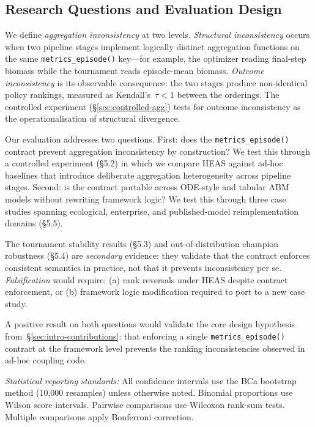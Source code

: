 \documentclass{wscpaperproc}
\begin{document}
\subsection{Research Questions and Evaluation Design}

We define \emph{aggregation inconsistency} at two levels. \emph{Structural inconsistency} occurs when two pipeline stages implement logically distinct aggregation functions on the same \texttt{metrics\_episode()} key---for example, the optimizer reading final-step biomass while the tournament reads episode-mean biomass. \emph{Outcome inconsistency} is its observable consequence: the two stages produce non-identical policy rankings, measured as Kendall's~$\tau < 1$ between the orderings. The controlled experiment (\S\ref{sec:controlled-agg}) tests for outcome inconsistency as the operationalisation of structural divergence.

Our evaluation addresses two questions. First: does the \texttt{metrics\_episode()}
contract prevent aggregation inconsistency by construction? We test this through
a controlled experiment (\S5.2) in which we compare HEAS
against ad-hoc baselines that introduce deliberate aggregation heterogeneity across
pipeline stages. Second: is the contract portable across ODE-style and tabular
ABM models without rewriting framework logic? We test this through three case
studies spanning ecological, enterprise, and published-model reimplementation
domains (\S5.5).

The tournament stability results (\S5.3) and out-of-distribution
champion robustness (\S5.4) are \emph{secondary} evidence: they
validate that the contract enforces consistent semantics in practice, not that
it prevents inconsistency per se. \emph{Falsification} would require: (a) rank
reversals under HEAS despite contract enforcement, or (b) framework logic
modification required to port to a new case study.

A positive result on both questions would validate the core design hypothesis from~\S\ref{sec:intro-contributions}: that enforcing a single \texttt{metrics\_episode()} contract at the framework level prevents the ranking inconsistencies observed in ad-hoc coupling code.

\emph{Statistical reporting standards:} All confidence intervals use the BCa
bootstrap method (10,000 resamples) unless otherwise noted. Binomial proportions
use Wilson score intervals. Pairwise comparisons use Wilcoxon rank-sum tests.
Multiple comparisons apply Bonferroni correction.
\end{document}
